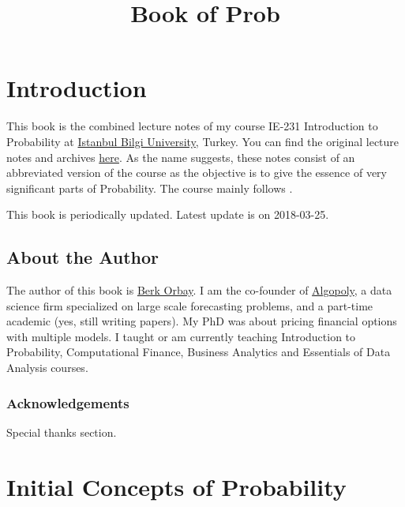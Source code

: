 \documentclass[]{book}
\title{Book of Prob}
\author{}
\date{}
\theoremstyle{definition}
\theoremstyle{definition}
\theoremstyle{definition}
\theoremstyle{remark}
\begin{document}
\maketitle

{
\setcounter{tocdepth}{1}
\tableofcontents
}
\hypertarget{introduction}{%
\chapter*{Introduction}\label{introduction}}

This book is the combined lecture notes of my course IE-231 Introduction
to Probability at \href{https://www.bilgi.edu.tr}{Istanbul Bilgi
University}, Turkey. You can find the original lecture notes and
archives \href{https://berkorbay.github.io/bilgi-ie231/}{here}. As the
name suggests, these notes consist of an abbreviated version of the
course as the objective is to give the essence of very significant parts
of Probability. The course mainly follows \citep{myers2012}.

This book is periodically updated. Latest update is on 2018-03-25.

\hypertarget{about-the-author}{%
\section*{About the Author}\label{about-the-author}}

The author of this book is \href{http://berkorbay.me}{Berk Orbay}. I am
the co-founder of \href{http://algopoly.com}{Algopoly}, a data science
firm specialized on large scale forecasting problems, and a part-time
academic (yes, still writing papers). My PhD was about pricing financial
options with multiple models. I taught or am currently teaching
Introduction to Probability, Computational Finance, Business Analytics
and Essentials of Data Analysis courses.

\hypertarget{acknowledgements}{%
\subsection*{Acknowledgements}\label{acknowledgements}}

Special thanks section.

\hypertarget{intro}{%
\chapter{Initial Concepts of Probability}\label{intro}}
\end{document}
